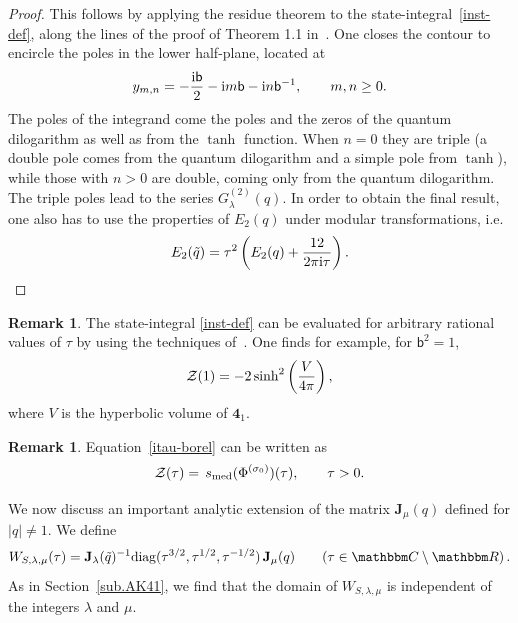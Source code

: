 \documentclass[12pt,reqno]{amsart}
\theoremstyle{definition}
\newtheorem{remark}[theorem]{Remark}
\def\BR{\mathbbm R}
\def\BC{\mathbbm C}
\def\tq{\tilde{q}}
\def\be{\begin{equation}}
\def\ee{\end{equation}}
\def\ri{\mathrm{i}}
\def\ri{{\rm i}}
\def\diag{\mathrm{diag}}
\def\bJ{\mathbf J}
\def\mc{\mathcal}
\def\md{\mathbf}
\def\IR{\mathbb{R}}
\newcommand{\knot}[1]{\md{#1}}
\newcommand{\mb}{{\mathsf{b}}}
\begin{document}
\begin{proof}
  This follows by applying the residue theorem to the
  state-integral~\eqref{inst-def}, along the lines of the proof of
  Theorem 1.1 in~\cite{GK:qseries}. One closes the contour to encircle the poles in
  the lower half-plane, located at 
  \be
  y_{m,n}= -{\ri \mb \over 2} -\ri m \mb -\ri n \mb^{-1}, \qquad m,n\ge 0. 
  \ee
  The poles of the integrand come the poles and the zeros of the quantum dilogarithm
  as well as from the $\tanh$ function. When $n=0$ they are triple (a double pole
  comes from the quantum dilogarithm and a simple pole from $\tanh$), while those
  with $n>0$ are double, coming only from the quantum dilogarithm. The triple poles
  lead to the series $G_\lambda^{(2)}(q)$. In order to obtain the final result, one
  also has to use the properties of $E_2(q)$ under modular transformations, i.e. 
  \be
  E_2(\tq)= \tau^2 \left( E_2 (q) + {12 \over 2 \pi \ri \tau} \right). 
  \ee
\end{proof}
 
\begin{remark}
  The state-integral \eqref{inst-def} can be evaluated for arbitrary rational values
  of $\tau$ by using the techniques of~\cite{GK:evaluation}. One finds for example,
  for $\mb^2=1$, 
 \be
 \mc{Z} (1)= -2 \sinh^2 \left( {V \over 4 \pi} \right), 
 \ee
 where $V$ is the hyperbolic volume of $\knot{4}_1$. 
\end{remark} 

\begin{remark} 
Equation~\eqref{itau-borel} can be written as 
%
\be
\label{nsi-median}
\mc{Z}(\tau)= \, s_{\rm med} ( \Phi^{(\sigma_0)} ) (\tau),
\qquad \tau >0. 
\ee
%
\end{remark}
 
We now discuss an important analytic extension of the matrix $\bJ_\mu(q)$
defined for $|q| \neq 1$. We define 
\be
\label{Wgt}
W_{S,\lambda,\mu}(\tau) = \bJ_\lambda(\tq)^{-1}
\diag(\tau^{3/2}, \tau^{1/2}, \tau^{-1/2}) \, \bJ_\mu(q)
\qquad (\tau \in \BC\setminus\BR)\,.
\ee
As in Section~\ref{sub.AK41}, we find that the domain of $W_{S,\lambda,\mu}$ is
independent of the integers $\lambda$ and $\mu$. 
\end{document}
